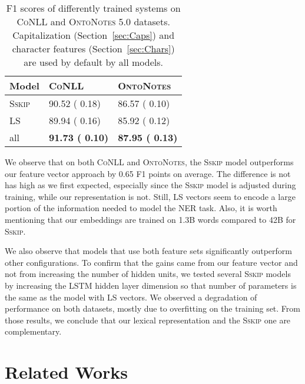 \documentclass[11pt]{article}
\newcommand{\conll}{\textsc{CoNLL}}
\newcommand{\onto}{\textsc{OntoNotes}}
\newcommand{\sskip}{\textsc{Sskip}}
\newcommand{\lr}{\textsc{LS}}
\begin{document}
	\begin{table}[h]
		\setlength{\tabcolsep}{2mm} 
		\begin{center} 
			\begin{tabular}{|l|l|l|}
				\hline 
				\textbf{Model} & \textbf{\conll}  & \textbf{\onto}\\ 
				\hline
				\sskip              & 90.52 ( 0.18) & 86.57 ( 0.10) \\
				\lr & 89.94 ( 0.16) & 85.92 ( 0.12) \\
				\hline
				all                     & \bf 91.73  ( 0.10) & \bf 87.95 ( 0.13) \\
				\hline
			\end{tabular}
			
		\end{center}
		\caption{F1 scores of differently trained systems  on \conll{ } and \onto{ 5.0} datasets. Capitalization (Section~\ref{sec:Caps})  and character features  (Section~\ref{sec:Chars})  are used by default by all models.}
		
		\label{tab:ablation} 
	\end{table}		
	
	
	We observe that on both \conll{} and \onto{}, the \sskip{} model outperforms our feature vector approach by 0.65 F1 points on average. The difference is not has high as we first expected, especially since the \sskip{} model is adjusted during training, while our representation is not.	Still, \lr{} vectors seem to  encode a large portion of the information needed to model the NER task. Also, it is worth mentioning that our embeddings are trained on 1.3B words compared to 42B for \sskip.
	
	We also observe  that models that use both feature sets significantly outperform other configurations. To confirm that the gains came from our feature vector and not from increasing the number of hidden units, we tested several \sskip{} models by increasing the LSTM hidden layer dimension so that number of parameters is the same as the model with \lr{} vectors. We observed a degradation of performance on both datasets, mostly due to overfitting on the training set. From those results, we conclude that our lexical representation and the \sskip{} one are complementary. 
	
	\section{Related Works}
	\label{sec:related}
	
\end{document}
